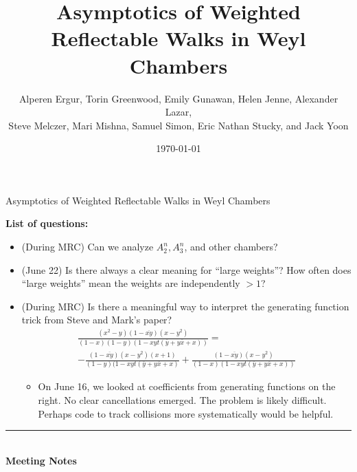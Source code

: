 \documentclass[letterpaper]{article}
\title{Asymptotics of Weighted Reflectable Walks in Weyl Chambers}
\author{Alperen Ergur, Torin Greenwood, Emily Gunawan, Helen Jenne, Alexander Lazar, \\Steve Melczer, Mari Mishna, Samuel Simon,  Eric Nathan Stucky, and Jack Yoon}
\date{\today}
\begin{document}
\fontsize{12}{13}
\large

\begin{center}
Asymptotics of Weighted Reflectable Walks in Weyl Chambers
\end{center}

{\bf List of questions:}
\begin{itemize}
\item (During MRC) Can we analyze $A_2^n, A_3^n$, and other chambers?
\item (June 22) Is there always a clear meaning for ``large weights''?  How often does ``large weights'' mean the weights are independently $>1$?
\item (During MRC) Is there a meaningful way to interpret the generating function trick from Steve and Mark's paper?
\begin{multline*}
\frac{(x^2 - y)(1 - \overline{xy})(x - y^2)}{(1 - x)(1 - y)(1 - xyt(\overline{y} + y\overline{x} + x))} =\\
 -\frac{(1 - \overline{xy})(x - y^2)(x + 1)}{(1 - y)(1 - xyt(\overline{y} + y\overline{x} + x)} + \frac{(1 - \overline{xy})(x - y^2)}{(1 - x)(1 - xyt(\overline{y} + y\overline{x} + x))}
\end{multline*}
\begin{itemize}
\item On June 16, we looked at coefficients from generating functions on the right.  No clear cancellations emerged.  The problem is likely difficult.  Perhaps code to track collisions more systematically would be helpful.
\end{itemize}
\end{itemize}

\hrule\ \\
{\bf Meeting Notes}\ \\\ \\
\end{document}
